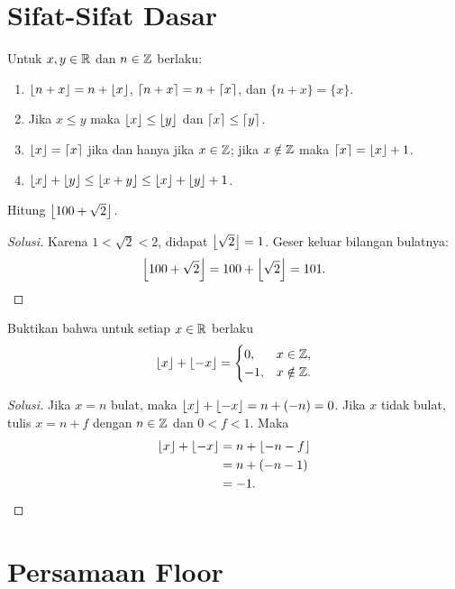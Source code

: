 \documentclass[12pt]{scrartcl}
\begin{document}
\section{Sifat-Sifat Dasar}

\begin{fact}
Untuk $x, y \in \mathbb R$ dan $n \in \mathbb Z$ berlaku:
\begin{enumerate}
    \item $\left\lfloor n + x \right\rfloor = n + \left\lfloor x \right\rfloor$,
    $\left\lceil n + x \right\rceil = n + \left\lceil x \right\rceil$, dan $\{n + x\} = \{x\}$.
    \item Jika $x \le y$ maka $\left\lfloor x \right\rfloor \le \left\lfloor y \right\rfloor$
    dan $\left\lceil x \right\rceil \le \left\lceil y \right\rceil$.
    \item $\left\lfloor x \right\rfloor = \left\lceil x \right\rceil$ jika dan hanya jika $x \in \mathbb Z$;
    jika $x \notin \mathbb Z$ maka $\left\lceil x \right\rceil = \left\lfloor x \right\rfloor + 1$.
    \item $\left\lfloor x \right\rfloor + \left\lfloor y \right\rfloor \le \left\lfloor x + y \right\rfloor
    \le \left\lfloor x \right\rfloor + \left\lfloor y \right\rfloor + 1$.
\end{enumerate}
\end{fact}

\begin{example}
Hitung $\left\lfloor 100 + \sqrt{2} \right\rfloor$.
\end{example}
\begin{proof}[Solusi]
Karena $1 < \sqrt{2} < 2$, didapat $\left\lfloor \sqrt{2} \right\rfloor = 1$.
Geser keluar bilangan bulatnya:
\[ \left\lfloor 100 + \sqrt{2} \right\rfloor = 100 + \left\lfloor \sqrt{2} \right\rfloor = 101. \]
\end{proof}

\begin{example}
Buktikan bahwa untuk setiap $x \in \mathbb R$ berlaku
\[ \left\lfloor x \right\rfloor + \left\lfloor -x \right\rfloor =
\begin{cases}
0, & x \in \mathbb Z, \\
-1, & x \notin \mathbb Z.
\end{cases} \]
\end{example}
\begin{proof}[Solusi]
Jika $x = n$ bulat, maka $\left\lfloor x \right\rfloor + \left\lfloor -x \right\rfloor = n + (-n) = 0$.
Jika $x$ tidak bulat, tulis $x = n + f$ dengan $n \in \mathbb Z$
dan $0 < f < 1$. Maka
\begin{align*}
\left\lfloor x \right\rfloor + \left\lfloor -x \right\rfloor &= n + \left\lfloor -n - f \right\rfloor \\
&= n + (-n - 1) \\
&= -1.
\end{align*}
\end{proof}

\section{Persamaan Floor}
\end{document}
